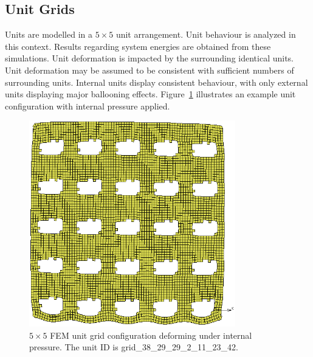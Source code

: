 \subsection{Unit Grids}

Units are modelled in a $5\times 5$ unit arrangement. Unit behaviour is analyzed in this context. Results regarding system energies are obtained from these simulations. Unit deformation is impacted by the surrounding identical units. Unit deformation may be assumed to be consistent with sufficient numbers of surrounding units. Internal units display consistent behaviour, with only external units displaying major ballooning effects. Figure~\ref{fig:griddef} illustrates an example unit configuration with internal pressure applied.

\begin{figure}[H]
	\centering
	\includegraphics[width=0.8\textwidth]{grid_deform.png}
	\caption[FEM unit grid configuration deforming under internal pressure]{$5\times 5$ FEM unit grid configuration deforming under internal pressure. The unit ID is grid\_38\_29\_29\_2\_11\_23\_42.}
	\label{fig:griddef}
\end{figure}